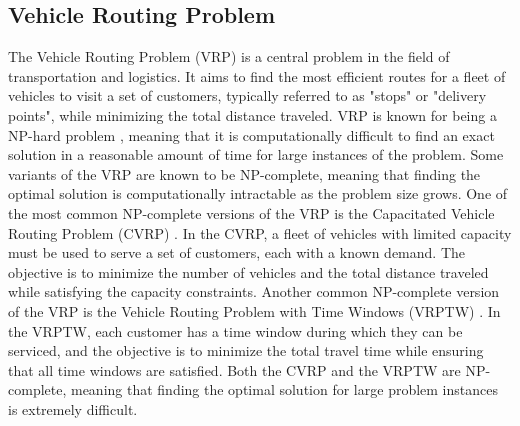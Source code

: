 \subsection{Vehicle Routing Problem}\label{subsec:vehicle-routing-problem}

The Vehicle Routing Problem (VRP) is a central problem in the field of transportation and logistics.
It aims to find the most efficient routes for a fleet of vehicles to visit a set of customers,
typically referred to as "stops" or "delivery points", while minimizing the total distance traveled.
VRP is known for being a NP-hard problem \cite{toth2002vehicle}, meaning that it is computationally difficult to find an exact solution
in a reasonable amount of time for large instances of the problem.
Some variants of the VRP are known to be NP-complete, meaning that finding the optimal solution is
computationally intractable as the problem size grows.
One of the most common NP-complete versions of the VRP is the Capacitated Vehicle Routing Problem (CVRP) \cite{Toth2014}.
In the CVRP, a fleet of vehicles with limited capacity must be used to serve a set of customers, each with a known
demand. The objective is to minimize the number of vehicles and the total distance traveled while satisfying
the capacity constraints.
Another common NP-complete version of the VRP is the Vehicle Routing Problem with Time Windows (VRPTW) \cite{Desrochers1992}.
In the VRPTW, each customer has a time window during which they can be serviced, and the objective is to minimize
the total travel time while ensuring that all time windows are satisfied.
Both the CVRP and the VRPTW are NP-complete, meaning that finding the optimal solution for large problem instances is
extremely difficult.

